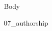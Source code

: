 \documentclass[11pt,a4paper]{article}
\begin{document}
\firstpage


\tableofcontents
\pagebreak

{Body}
\pagebreak

\bibliopage
\pagebreak

{07_authorship}
\end{document}
